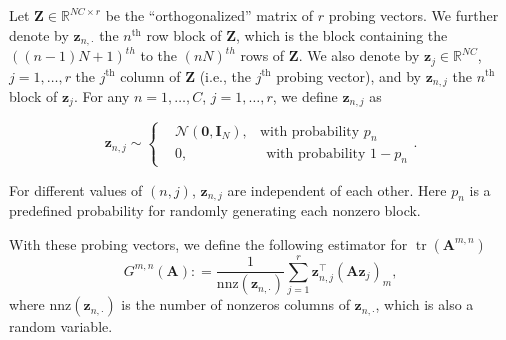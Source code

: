 \documentclass[10pt]{article}
\newcommand{\B}{\mathbf}
\begin{document}
Let $\B{Z}\in \mathbb{R}^{NC\times r}$ be the ``orthogonalized'' matrix of $r$ probing vectors. We further denote by $\B{z}_{n,\cdot}$ the $n^\text{th}$ row block of $\B{Z}$, which is the block containing the $((n-1)N+1)^{th}$ to the $(nN)^{th}$ rows of $\B{Z}$. We also denote by $\B{z}_{j}\in \mathbb{R}^{NC}$, $j=1,\ldots,r$ the $j^\text{th}$ column of $\B{Z}$ (i.e., the $j^\text{th}$ probing vector), and by $\B{z}_{n, j}$ the $n^\text{th}$ block of $\B{z}_{j}$. For any $n=1,\ldots,C$, $j=1,\ldots,r$, we define $\B{z}_{n,j}$ as

\begin{equation}\label{eq:z2}
\B{z}_{n,j} \sim \left\{\begin{aligned}&\mathcal{N}(\B{0},\B{I}_{N}), & \textrm{with probability } p_{n} \\ & 0, & \ \ \textrm{with probability } 1-p_{n} \end{aligned} \right..
\end{equation}

For different values of $(n,j)$, $\B{z}_{n,j}$ are independent of each other. Here $p_n$ is a predefined probability for randomly generating each nonzero block.

With these probing vectors, we define the following estimator for $\operatorname{tr}(\B{A}^{m,n})$
\[
G^{m, n}(\B{A}) : = \frac{1}{\textrm{nnz}(\B{z}_{n,\cdot})} \sum_{j=1}^r \B{z}_{n,j}^{\top} (\B{A} \B{z}_j)_m ,
\]
where $\textrm{nnz}(\B{z}_{n,\cdot})$ is the number of nonzeros columns of $\B{z}_{n,\cdot}$, which is also a random variable.
\end{document}
